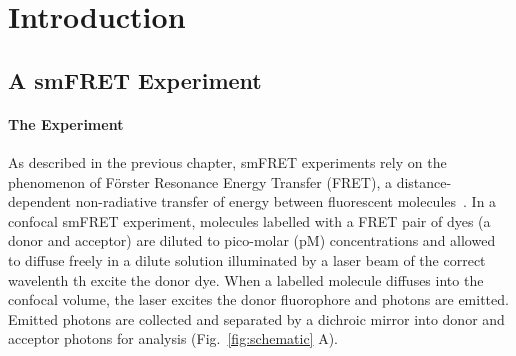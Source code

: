 
\section{Introduction}
\subsection{A smFRET Experiment}
\paragraph{The Experiment}
As described in the previous chapter, smFRET experiments rely on the phenomenon of F\"{o}rster Resonance Energy Transfer (FRET), a distance-dependent non-radiative transfer of energy between fluorescent molecules~\cite{forster48, ha96}. In a confocal smFRET experiment, molecules labelled with a FRET pair of dyes (a donor and acceptor) are diluted to pico-molar (pM) concentrations and allowed to diffuse freely in a dilute solution illuminated by a laser beam of the correct wavelenth th excite the donor dye. When a labelled molecule diffuses into the confocal volume, the laser excites the donor fluorophore and photons are emitted.  Emitted photons are collected and separated by a dichroic mirror into donor and acceptor photons for analysis (Fig.~\ref{fig:schematic} A).
 

